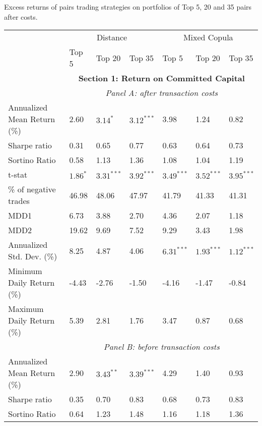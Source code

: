 \documentclass[a4paper]{article}
\begin{document}
\begin{threeparttable}[H]
	\centering \scriptsize
	\caption{Excess returns of pairs trading strategies on portfolios of Top 5, 20 and 35 pairs after costs.}
	\begin{tabularx}{\textwidth}{@{\extracolsep{\fill}}lllllll@{}}
		\toprule
		& \multicolumn{3}{c}{Distance} & \multicolumn{3}{c}{Mixed Copula} \\\cmidrule{2-4} \cmidrule{5-7}
		& Top 5 & Top 20 & Top 35 & Top 5 & Top 20 & Top 35 \\
		\midrule
		& \multicolumn{6}{c}{\textbf{Section 1: Return on Committed Capital}} \\
		& \multicolumn{6}{c}{\textit {Panel A: after transaction costs}} \\
		Annualized Mean Return (\%) & 2.60  & $3.14^{*}$  & $3.12^{***}$  & 3.98  & 1.24  & 0.82 \\
		Sharpe ratio & 0.31  & 0.65  & 0.77  & 0.63  & 0.64  & 0.73 \\
		Sortino Ratio & 0.58  & 1.13  & 1.36  & 1.08  & 1.04  & 1.19 \\
		t-stat & $1.86^{*}$  & $3.31^{***}$  & $3.92^{***}$  & $3.49^{***}$  & $3.52^{***}$  & $3.95^{***}$ \\
		\% of negative trades & 46.98 & 48.06 & 47.97 & 41.79 & 41.33 & 41.31 \\
		MDD1  & 6.73  & 3.88  & 2.70  & 4.36  & 2.07  & 1.18 \\
		MDD2  & 19.62 & 9.69  & 7.52  & 9.29  & 3.43  & 1.98 \\
		Annualized Std. Dev. (\%) & 8.25  & 4.87  & 4.06  & $6.31^{***}$  & $1.93^{***}$  & $1.12^{***}$ \\
		Minimum Daily Return (\%) & -4.43 & -2.76 & -1.50 & -4.16 & -1.47 & -0.84 \\
		Maximum Daily Return (\%) & 5.39  & 2.81  & 1.76  & 3.47  & 0.87  & 0.68 \\
		\midrule
		& \multicolumn{6}{c}{\textit {Panel B: before transaction costs}} \\
		Annualized Mean Return (\%) & 2.90  & $3.43^{**}$  & $3.39^{***}$  & 4.29  & 1.40  & 0.93 \\
		Sharpe ratio & 0.35  & 0.70  & 0.83  & 0.68  & 0.73  & 0.83 \\
		Sortino Ratio & 0.64  & 1.23  & 1.48  & 1.16  & 1.18  & 1.36 \\

\end{tabularx}
\end{threeparttable}
\end{document}
